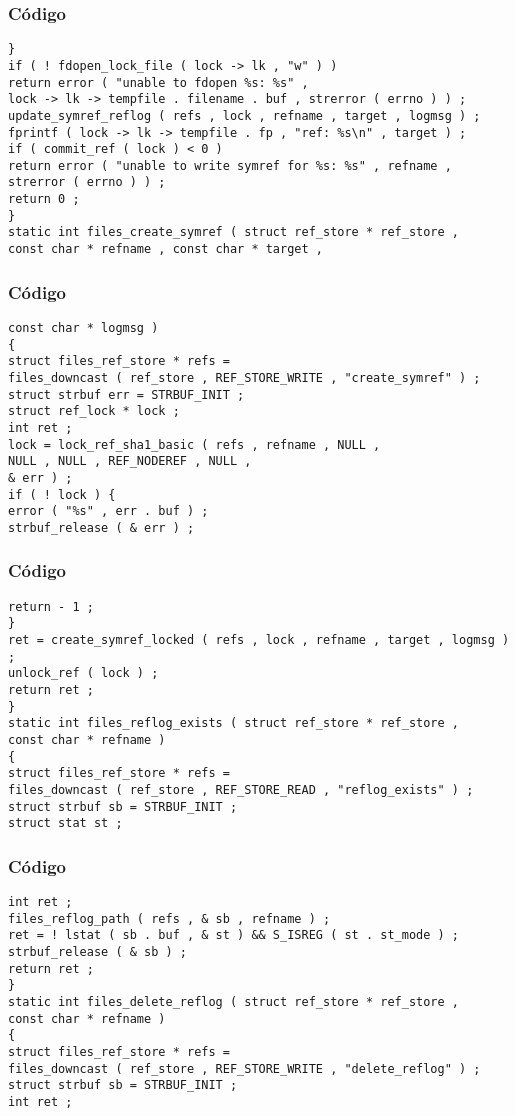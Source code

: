 \documentclass{beamer}
\begin{document}
\begin{frame}[fragile]
\frametitle{C\'odigo}
\begin{verbatim}
} 
if ( ! fdopen_lock_file ( lock -> lk , "w" ) ) 
return error ( "unable to fdopen %s: %s" , 
lock -> lk -> tempfile . filename . buf , strerror ( errno ) ) ; 
update_symref_reflog ( refs , lock , refname , target , logmsg ) ; 
fprintf ( lock -> lk -> tempfile . fp , "ref: %s\n" , target ) ; 
if ( commit_ref ( lock ) < 0 ) 
return error ( "unable to write symref for %s: %s" , refname , 
strerror ( errno ) ) ; 
return 0 ; 
} 
static int files_create_symref ( struct ref_store * ref_store , 
const char * refname , const char * target , 
\end{verbatim}
\end{frame}
\begin{frame}[fragile]
\frametitle{C\'odigo}
\begin{verbatim}
const char * logmsg ) 
{ 
struct files_ref_store * refs = 
files_downcast ( ref_store , REF_STORE_WRITE , "create_symref" ) ; 
struct strbuf err = STRBUF_INIT ; 
struct ref_lock * lock ; 
int ret ; 
lock = lock_ref_sha1_basic ( refs , refname , NULL , 
NULL , NULL , REF_NODEREF , NULL , 
& err ) ; 
if ( ! lock ) { 
error ( "%s" , err . buf ) ; 
strbuf_release ( & err ) ; 
\end{verbatim}
\end{frame}
\begin{frame}[fragile]
\frametitle{C\'odigo}
\begin{verbatim}
return - 1 ; 
} 
ret = create_symref_locked ( refs , lock , refname , target , logmsg ) ; 
unlock_ref ( lock ) ; 
return ret ; 
} 
static int files_reflog_exists ( struct ref_store * ref_store , 
const char * refname ) 
{ 
struct files_ref_store * refs = 
files_downcast ( ref_store , REF_STORE_READ , "reflog_exists" ) ; 
struct strbuf sb = STRBUF_INIT ; 
struct stat st ; 
\end{verbatim}
\end{frame}
\begin{frame}[fragile]
\frametitle{C\'odigo}
\begin{verbatim}
int ret ; 
files_reflog_path ( refs , & sb , refname ) ; 
ret = ! lstat ( sb . buf , & st ) && S_ISREG ( st . st_mode ) ; 
strbuf_release ( & sb ) ; 
return ret ; 
} 
static int files_delete_reflog ( struct ref_store * ref_store , 
const char * refname ) 
{ 
struct files_ref_store * refs = 
files_downcast ( ref_store , REF_STORE_WRITE , "delete_reflog" ) ; 
struct strbuf sb = STRBUF_INIT ; 
int ret ; 
\end{verbatim}
\end{frame}
\end{document}
